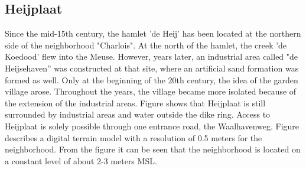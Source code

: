 \newpage

\subsection{Heijplaat}
Since the mid-15th century, the hamlet 'de Heij' has been located at the northern side of the neighborhood "Charlois". At the north of the hamlet, the creek 'de Koedood' flew into the Meuse. However, years later, an industrial area called "de Heijsehaven'' was constructed at that site, where an artificial sand formation was formed as well. Only at the beginning of the 20th century, the idea of the garden village arose. Throughout the years, the village became more isolated because of the extension of the industrial areas. Figure  shows that Heijplaat is still surrounded by industrial areas and water outside the dike ring. Access to Heijplaat is solely possible through one entrance road, the Waalhavenweg. Figure  describes a digital terrain model with a resolution of 0.5 meters for the neighborhood. From the figure it can be seen that the neighborhood is located on a constant level of about 2-3 meters MSL. 

